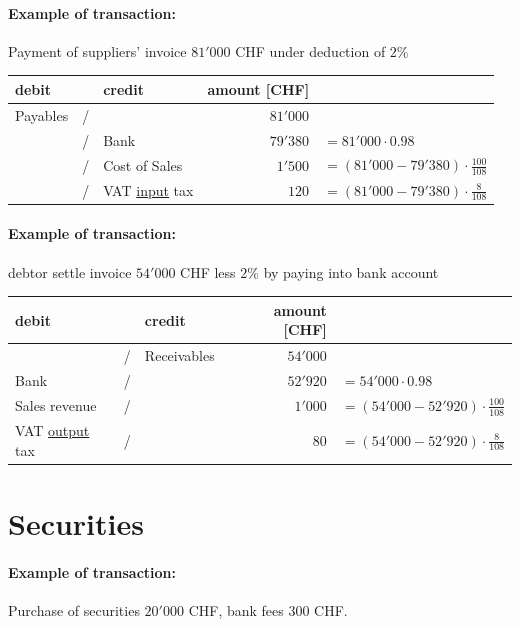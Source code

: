 \documentclass[a4paper] {scrartcl}
\begin{document}
\paragraph{Example of transaction:}


Payment of suppliers' invoice $81'000$ CHF under deduction of $2\%$\\

\begin{tabular}{lllrl}
	\textbf{debit} & & \textbf{credit} & \textbf{amount} [CHF]&\\
	\hline
	Payables & / &  & $81'000$&\\
	 & / & Bank  & $79'380$&$=81'000\cdot0.98$\\
	 & / & Cost of Sales  & $1'500$&$=(81'000-79'380)\cdot\frac{100}{108}$\\
	 & / & VAT \underline{input} tax  & $120$&$=(81'000-79'380)\cdot\frac{8}{108}$\\
\end{tabular}


\paragraph{Example of transaction:}


debtor settle invoice $54'000$ CHF less $2\%$ by paying into bank account\\

\begin{tabular}{lllrl}
	\textbf{debit} & & \textbf{credit} & \textbf{amount} [CHF]&\\
	\hline
	 & / & Receivables & $54'000$&\\
	 Bank & / &  & $52'920$&$=54'000\cdot0.98$\\
	 Sales revenue & / & & $1'000$&$=(54'000-52'920)\cdot\frac{100}{108}$\\
	 VAT \underline{output} tax & / &  & $80$&$=(54'000-52'920)\cdot\frac{8}{108}$\\
\end{tabular}

\section{Securities}
\paragraph{Example of transaction:}


Purchase of securities $20'000$ CHF, bank fees $300$ CHF.\\
\end{document}
